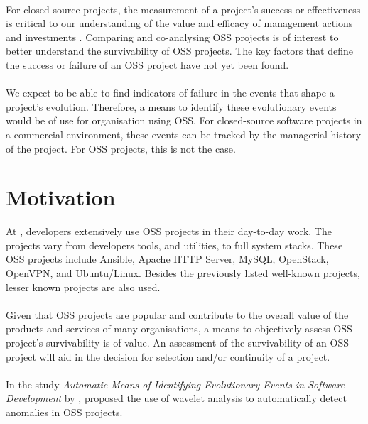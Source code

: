 \paragraph{}
For closed source projects, the measurement of a project's success or
effectiveness is critical to our understanding of the value and efficacy of
management actions and investments \cite{delone2003}. Comparing and
co-analysing OSS projects is of interest to better understand the survivability
of OSS projects. The key factors that define the success or failure of an OSS
project have not yet been found.

\paragraph{}
We expect to be able to find indicators of failure in the events that
shape a project's evolution. Therefore, a means to identify these evolutionary
events would be of use for organisation using OSS. For closed-source software
projects in a commercial environment, these events can be tracked by the
managerial history of the project. For OSS projects, this is not the case.



\section{Motivation}
At \hostOrg, developers extensively use OSS projects in their day-to-day
work. The projects vary from developers tools, and utilities, to full system
stacks. These OSS projects include Ansible, Apache HTTP Server, MySQL,
OpenStack, OpenVPN, and Ubuntu/Linux. Besides the previously listed well-known
projects, lesser known projects are also used.

\paragraph{}
Given that OSS projects are popular and contribute to the overall value of the
products and services of many organisations, a means to objectively assess OSS
project's survivability is of value. An assessment of the survivability of an
OSS project will aid in the decision for selection and/or continuity of a
project.

\paragraph{}
In the study \emph{Automatic Means of Identifying Evolutionary Events in
Software Development }\rm by \citet{karus2013}, \citeauthor{karus2013} proposed
the use of wavelet analysis to automatically detect anomalies in OSS projects.

